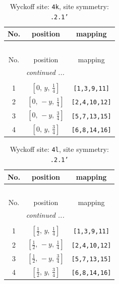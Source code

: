 \documentclass[fleqn,8pt]{jsarticle}
\begin{document}
\renewcommand{\arraystretch}{1.2}
\begin{longtable}{ccc}
\caption{Wyckoff site: {\tt 4k}, site symmetry: {\tt .2.1'}}
 \\
 \hline \hline
No. & position & mapping \\ \hline \endfirsthead

\multicolumn{2}{l}{\tablename\ \thetable{}} \\
 \hline \hline
No. & position & mapping \\ \hline \endhead

 \hline \hline
\multicolumn{2}{r}{\footnotesize\it continued ...} \\ \endfoot

 \hline \hline
\multicolumn{2}{r}{} \\ \endlastfoot

1 & $\left[ 0,\, y,\, \frac{1}{4} \right]$ & {\tt [1,3,9,11]} \\ \hline
2 & $\left[ 0,\, - y,\, \frac{1}{4} \right]$ & {\tt [2,4,10,12]} \\ \hline
3 & $\left[ 0,\, - y,\, \frac{3}{4} \right]$ & {\tt [5,7,13,15]} \\ \hline
4 & $\left[ 0,\, y,\, \frac{3}{4} \right]$ & {\tt [6,8,14,16]} \\
\end{longtable}
\renewcommand{\arraystretch}{1.2}
\begin{longtable}{ccc}
\caption{Wyckoff site: {\tt 4l}, site symmetry: {\tt .2.1'}}
 \\
 \hline \hline
No. & position & mapping \\ \hline \endfirsthead

\multicolumn{2}{l}{\tablename\ \thetable{}} \\
 \hline \hline
No. & position & mapping \\ \hline \endhead

 \hline \hline
\multicolumn{2}{r}{\footnotesize\it continued ...} \\ \endfoot

 \hline \hline
\multicolumn{2}{r}{} \\ \endlastfoot

1 & $\left[ \frac{1}{2},\, y,\, \frac{1}{4} \right]$ & {\tt [1,3,9,11]} \\ \hline
2 & $\left[ \frac{1}{2},\, - y,\, \frac{1}{4} \right]$ & {\tt [2,4,10,12]} \\ \hline
3 & $\left[ \frac{1}{2},\, - y,\, \frac{3}{4} \right]$ & {\tt [5,7,13,15]} \\ \hline
4 & $\left[ \frac{1}{2},\, y,\, \frac{3}{4} \right]$ & {\tt [6,8,14,16]} \\
\end{longtable}
\end{document}
